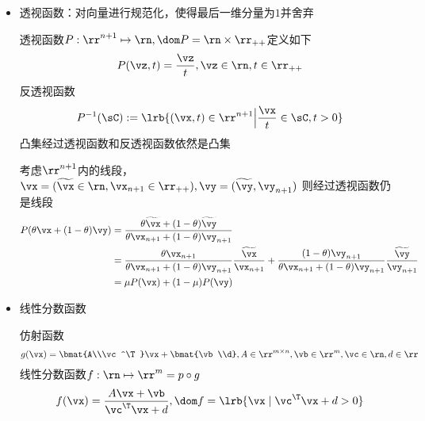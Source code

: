 \begin{itemize}
	\item 透视函数：对向量进行规范化，使得最后一维分量为$1$并舍弃
\begin{definition}
透视函数$P:\rr^{n+1}\mapsto\rn,\dom P=\rn\times\rr_{++}$定义如下
\[P(\vz,t)=\dfrac{\vz}{t},\vz\in\rn,t\in\rr_{++}\]
反透视函数
\[P^{-1}(\sC):=\lrb{(\vx,t)\in\rr^{n+1}\Big|\frac{\vx}{t}\in \sC,t>0}\]
凸集经过透视函数和反透视函数依然是凸集
\end{definition}
\begin{analysis}
考虑$\rr^{n+1}$内的线段，$\vx=(\widetilde{\vx}\in\rn,\vx_{n+1}\in\rr_{++}),\vy=(\widetilde{\vy},\vy_{n+1})$
则经过透视函数仍是线段
\[\begin{aligned}
	P(\theta \vx+(1-\theta)\vy)&=\frac{\theta\widetilde{\vx}+(1-\theta)\widetilde{\vy}}{\theta \vx_{n+1}+(1-\theta) \vy_{n+1}}\\
	&=\frac{\theta \vx_{n+1}}{\theta \vx_{n+1}+(1-\theta)\vy_{n+1}}\frac{\widetilde{\vx}}{\vx_{n+1}}+\frac{(1-\theta)\vy_{n+1}}{\theta \vx_{n+1}+(1-\theta)\vy_{n+1}}\frac{\widetilde{\vy}}{\vy_{n+1}}\\
	&=\mu P(\vx)+(1-\mu)P(\vy)
\end{aligned}\]
\end{analysis}

	\item 线性分数函数
\begin{definition}[线性分数函数]
仿射函数
\[g(\vx)=\bmat{A\\\vc^\T}\vx+\bmat{\vb\\d},A\in\rr^{m\times n},\vb\in\rr^m,\vc\in\rn,d\in\rr\]
线性分数函数$f:\rn\mapsto\rr^m=p\circ g$
\[f(\vx)=\frac{A\vx+\vb}{\vc^\T \vx+d},\dom f=\lrb{\vx\mid \vc^\T\vx+d>0}\]
\end{definition}

\end{itemize}